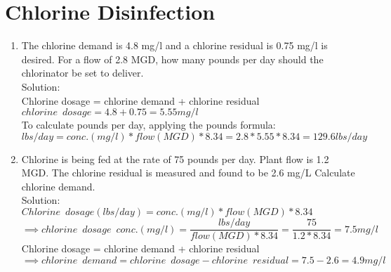 \section{Chlorine Disinfection}
\begin{enumerate}
\item The chlorine demand is 4.8 mg/l and a chlorine residual is 0.75 mg/l is desired. For a flow of 2.8 MGD, how many pounds per day should the chlorinator be set to deliver.\\
Solution:\\
Chlorine dosage = chlorine demand + chlorine residual\\
$chlorine \enspace dosage=4.8+0.75=5.55mg/l$\\
To calculate pounds per day, applying the pounds formula:\\  
$lbs/day=conc. (mg/l)*flow(MGD)*8.34=2.8*5.55*8.34=\boxed{129.6lbs/day}$\\

\item Chlorine is being fed at the rate of 75 pounds per day. Plant flow is 1.2 MGD. The chlorine residual is measured and found to be 2.6 mg/L Calculate chlorine demand.\\
Solution:\\
$Chlorine \enspace dosage (lbs/day)=conc. (mg/l)*flow(MGD)*8.34$\\
$\implies chlorine \enspace dosage \enspace conc. (mg/l)=\dfrac{lbs/day}{flow(MGD)*8.34}=\dfrac{75}{1.2*8.34}=7.5mg/l$\\
Chlorine dosage = chlorine demand + chlorine residual\\
$ \implies chlorine \enspace demand = chlorine \enspace dosage - chlorine \enspace residual=7.5-2.6=\boxed{4.9mg/l}$

\end{enumerate}

